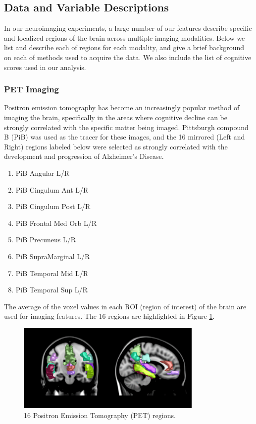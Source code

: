 \subsection{Data and Variable Descriptions}
In our neuroimaging experiments, a large number of our features describe specific and localized regions of the brain across multiple imaging modalities. Below we list and describe each of regions for each modality, and give a brief background on each of methods used to acquire the data. We also include the list of cognitive scores used in our analysis.

\subsubsection{PET Imaging}
Positron emission tomography has become an increasingly popular method of imaging the brain, specifically in the areas where cognitive decline can be strongly correlated with the specific matter being imaged. Pittsburgh compound B (PiB) was used as the tracer for these images, and the 16 mirrored (Left and Right) regions labeled below were selected as strongly correlated with the development and progression of Alzheimer's Disease.
{\small
\begin{enumerate}
\item PiB Angular L/R
\item PiB Cingulum Ant L/R
\item PiB Cingulum Post L/R
\item PiB Frontal Med Orb L/R
\item PiB Precuneus L/R
\item PiB SupraMarginal L/R
\item PiB Temporal Mid L/R
\item PiB Temporal Sup L/R
\end{enumerate}
}

The average of the voxel values in each ROI (region of interest) of the brain are used for imaging features.
The 16 regions are highlighted in Figure \ref{fig:pibrois}.

\begin{figure}
\centering
  \includegraphics[width=0.8\textwidth]{3_covtraj/figs/PiBROIsMontage.png}
  \caption{\label{fig:pibrois}16 Positron Emission Tomography (PET) regions.}
\end{figure}

